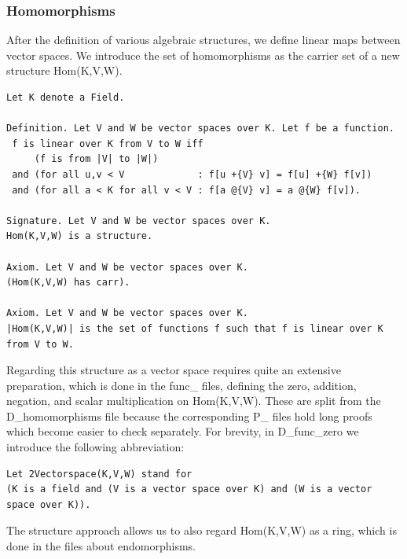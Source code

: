 \documentclass[11pt]{article}
\begin{document}
\subsubsection{Homomorphisms}
After the definition of various algebraic structures, we define linear maps between vector spaces.
We introduce the set of homomorphisms as the carrier set of a new structure {\ftl Hom(K,V,W)}.
\begin{lstlisting}
Let K denote a Field.

Definition. Let V and W be vector spaces over K. Let f be a function.
 f is linear over K from V to W iff
     (f is from |V| to |W|)
 and (for all u,v < V             : f[u +{V} v] = f[u] +{W} f[v])
 and (for all a < K for all v < V : f[a @{V} v] = a @{W} f[v]).

Signature. Let V and W be vector spaces over K.
Hom(K,V,W) is a structure.

Axiom. Let V and W be vector spaces over K.
(Hom(K,V,W) has carr).

Axiom. Let V and W be vector spaces over K.
|Hom(K,V,W)| is the set of functions f such that f is linear over K from V to W.
\end{lstlisting}

Regarding this structure as a vector space requires quite an extensive preparation, which is done in the func\_ files, defining the zero, addition, negation, and scalar multiplication on {\ftl Hom(K,V,W)}. These are split from the D\_homomorphisms file because the corresponding P\_ files hold long proofs which become easier to check separately.
For brevity, in D\_func\_zero we introduce the following abbreviation:
\begin{lstlisting}
Let 2Vectorspace(K,V,W) stand for
(K is a field and (V is a vector space over K) and (W is a vector space over K)).
\end{lstlisting}

The {\ftl structure} approach allows us to also regard {\ftl Hom(K,V,W)} as a ring, which is done in the files about endomorphisms.
\end{document}
